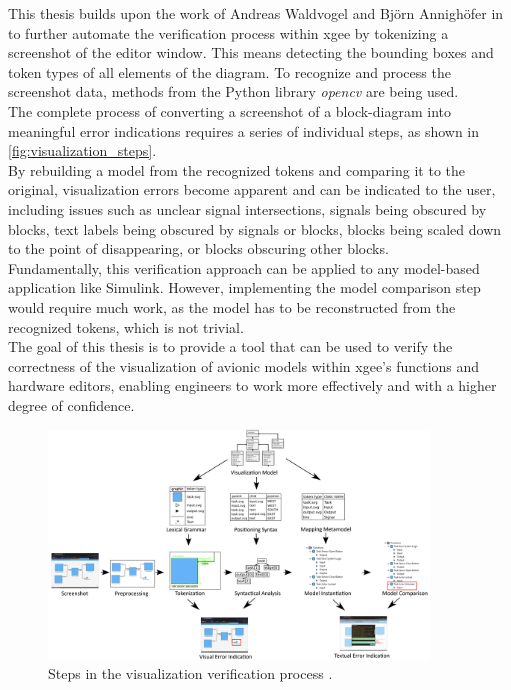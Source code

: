 This thesis builds upon the work of Andreas Waldvogel and Bj{\"o}rn Annigh{\"o}fer in \cite{waldvogel_annighoefer_models_2024} to further automate the verification process within \acrshort{xgee} by tokenizing a screenshot of the editor window. This means detecting the bounding boxes and token types of all elements of the diagram. To recognize and process the screenshot data, methods from the Python library \textit{\acrshort{opencv}} are being used.\\
The complete process of converting a screenshot of a block-diagram into meaningful error indications requires a series of individual steps, as shown in \autoref{fig:visualization_steps}.\\
By rebuilding a model from the recognized tokens and comparing it to the original, visualization errors become apparent and can be indicated to the user, including issues such as unclear signal intersections, signals being obscured by blocks, text labels being obscured by signals or blocks, blocks being scaled down to the point of disappearing, or blocks obscuring other blocks.\\
Fundamentally, this verification approach can be applied to any model-based application like Simulink. However, implementing the model comparison step would require much work, as the model has to be reconstructed from the recognized tokens, which is not trivial.\\
The goal of this thesis is to provide a tool that can be used to verify the correctness of the visualization of avionic models within \acrshort{xgee}'s functions and hardware editors, enabling engineers to work more effectively and with a higher degree of confidence.
\begin{figure}[h]
    \centering
    \includegraphics[width=0.9\textwidth]{pictures/visualization_steps.png}
    \caption[Steps in the visualization verification process]{Steps in the visualization verification process \cite{waldvogel_annighoefer_models_2024}.}
    \label{fig:visualization_steps}
\end{figure}

